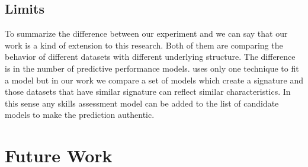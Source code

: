 \subsection{Limits}


To summarize the difference between our experiment and \cite{Desmarais2010} we can say that our work is a kind of extension to this research. Both of them are comparing the behavior of different datasets with different underlying structure. The difference is in the number of predictive performance models. \cite{Desmarais2010} uses only one technique to fit a model but in our work we compare a set of models which create a signature and those datasets that have similar signature can reflect similar characteristics. In this sense any skills assessment model can be added to the list of candidate models to make the prediction authentic.


%

%







\section{Future Work}
 



